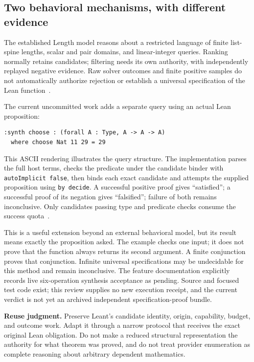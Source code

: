 \documentclass[11pt,letterpaper]{article}
\begin{document}
\subsection{Two behavioral mechanisms, with different evidence}
The established Length model reasons about a restricted language of finite
list-spine lengths, scalar and pair domains, and linear-integer queries. Ranking
normally retains candidates; filtering needs its own authority, with independently
replayed negative evidence. Raw solver outcomes and finite positive samples do
not automatically authorize rejection or establish a universal specification of
the Lean function~\cite{l-length}.

The current uncommitted work adds a separate query using an actual Lean proposition:
\begin{lstlisting}
:synth choose : (forall A : Type, A -> A -> A)
  where choose Nat 11 29 = 29
\end{lstlisting}
This ASCII rendering illustrates the query structure. The implementation parses
the full host terms, checks the predicate under the candidate binder with
\texttt{autoImplicit false}, then binds each exact candidate and attempts the
supplied proposition using \texttt{by decide}. A successful positive proof gives
``satisfied''; a successful proof of its negation gives ``falsified''; failure
of both remains inconclusive. Only candidates passing type and predicate checks
consume the success quota~\cite{l-behavior}.

This is a useful extension beyond an external behavioral model, but its result
means exactly the proposition asked. The example checks one input; it does not
prove that the function always returns its second argument. A finite conjunction
proves that conjunction. Infinite universal specifications may be undecidable
for this method and remain inconclusive. The feature documentation explicitly
records live six-operation synthesis acceptance as pending. Source and focused
test code exist; this review supplies no new execution receipt, and the current
verdict is not yet an archived independent specification-proof bundle.

\textbf{Reuse judgment.} Preserve Leant's candidate identity, origin, capability,
budget, and outcome work. Adapt it through a narrow protocol that receives the
exact original Lean obligation. Do not make a reduced structural representation
the authority for what theorem was proved, and do not treat provider enumeration
as complete reasoning about arbitrary dependent mathematics.
\end{document}
